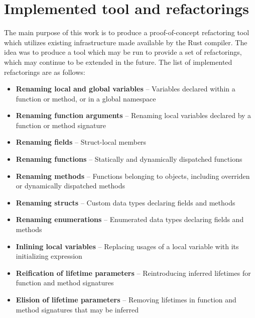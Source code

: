 
\section{Implemented tool and refactorings}\label{S:implemented}
The main purpose of this work is to produce a proof-of-concept refactoring tool which utilizes existing infrastructure made available by the Rust compiler. The idea was to produce a tool which may be run to provide a set of refactorings, which may continue to be extended in the future. The list of implemented refactorings are as follows:


\begin{itemize}
\item {\bfseries Renaming local and global variables} -- Variables declared within a function or method, or in a global namespace
\item {\bfseries Renaming function arguments} -- Renaming local variables declared by a function or method signature
\item {\bfseries Renaming fields} -- Struct-local members
\item {\bfseries Renaming functions} -- Statically and dynamically dispatched functions
\item {\bfseries Renaming methods} -- Functions belonging to objects, including overriden or dynamically dispatched methods
\item {\bfseries Renaming structs} -- Custom data types declaring fields and methods
\item {\bfseries Renaming enumerations} -- Enumerated data types declaring fields and methods
\item {\bfseries Inlining local variables} -- Replacing usages of a local variable with its initializing expression
\item {\bfseries Reification of lifetime parameters} -- Reintroducing inferred lifetimes for function and method signatures
\item {\bfseries Elision of lifetime parameters} -- Removing lifetimes in function and method signatures that may be inferred 
\end{itemize}

